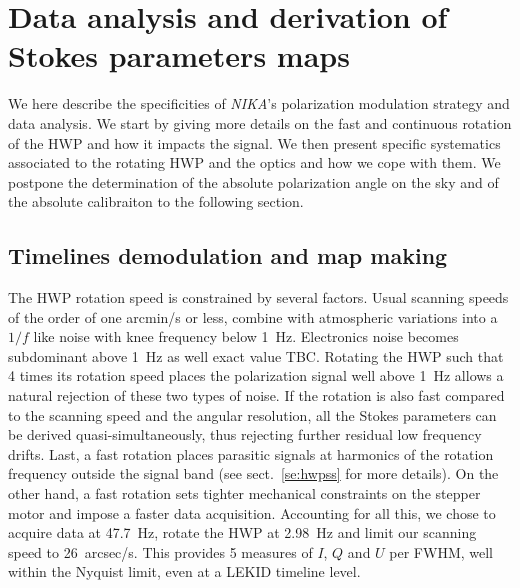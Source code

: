 \documentclass[twocolumn,traditabstract]{aa}
\newcommand{\nika}{{\it NIKA}}
\begin{document}
{\section{Data analysis and derivation of Stokes parameters maps}
\label{data_analysis}

We here describe the specificities of \nika's polarization modulation strategy
and data analysis. We start by giving more details on the fast and continuous
rotation of the HWP and how it impacts the signal. We then present specific
systematics associated to the rotating HWP and the optics and how we cope with
them. We postpone the determination of the absolute polarization angle on the
sky and of the absolute calibraiton to the following section.

\subsection{Timelines demodulation and map making}
\label{se:demod_mapmaking}


The HWP rotation speed is constrained by several factors. Usual scanning speeds
of the order of one arcmin/s or less, combine with atmospheric variations into a
$1/f$ like noise with knee frequency below 1~Hz. Electronics noise becomes
subdominant above 1~Hz as well {\color{red} exact value TBC}. Rotating the HWP
such that 4 times its rotation speed places the polarization signal well above
1~Hz allows a natural rejection of these two types of noise. If the rotation is
also fast compared to the scanning speed and the angular resolution, all the
Stokes parameters can be derived quasi-simultaneously, thus rejecting further
residual low frequency drifts. Last, a fast rotation places parasitic signals at
harmonics of the rotation frequency outside the signal band (see
sect.~\ref{se:hwpss} for more details). On the other hand, a fast rotation
sets tighter mechanical constraints on the stepper motor and impose a faster
data acquisition. Accounting for all this, we chose to acquire data at 47.7~Hz,
rotate the HWP at 2.98~Hz and limit our scanning speed to 26~arcsec/s. This
provides 5 measures of $I$, $Q$ and $U$ per FWHM, well within the Nyquist limit,
even at a LEKID timeline level.

}
\end{document}
